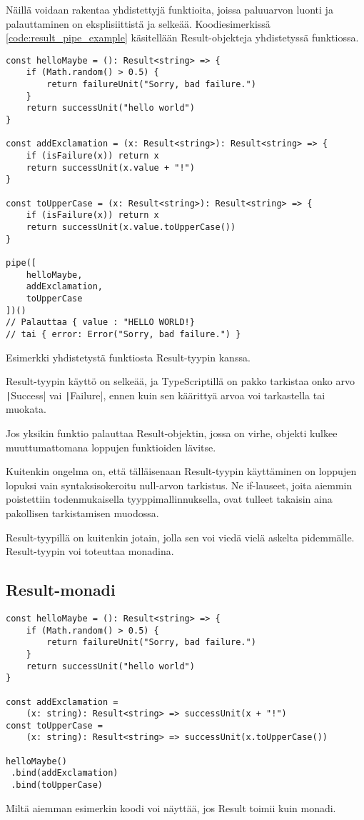 Näillä voidaan rakentaa yhdistettyjä funktioita, joissa paluuarvon luonti ja palauttaminen on eksplisiittistä ja selkeää. Koodiesimerkissä \ref{code:result_pipe_example} käsitellään Result-objekteja yhdistetyssä funktiossa.

\begin{code}
    \begin{verbatim}
const helloMaybe = (): Result<string> => {
    if (Math.random() > 0.5) {
        return failureUnit("Sorry, bad failure.")
    }
    return successUnit("hello world")
}

const addExclamation = (x: Result<string>): Result<string> => {
    if (isFailure(x)) return x
    return successUnit(x.value + "!")
}

const toUpperCase = (x: Result<string>): Result<string> => {
    if (isFailure(x)) return x
    return successUnit(x.value.toUpperCase())
}

pipe([
    helloMaybe,
    addExclamation,
    toUpperCase
])()
// Palauttaa { value : "HELLO WORLD!}
// tai { error: Error("Sorry, bad failure.") }
    \end{verbatim}
    \caption{Esimerkki yhdistetystä funktiosta Result-tyypin kanssa.}
    \label{code:result_pipe_example}
\end{code}

Result-tyypin käyttö on selkeää, ja TypeScriptillä on pakko tarkistaa onko arvo \texttt|Success| vai \texttt|Failure|, ennen kuin sen käärittyä arvoa voi tarkastella tai muokata.

Jos yksikin funktio palauttaa Result-objektin, jossa on virhe, objekti kulkee muuttumattomana loppujen funktioiden lävitse.

Kuitenkin ongelma on, että tälläisenaan Result-tyypin käyttäminen on loppujen lopuksi vain syntaksisokeroitu null-arvon tarkistus. Ne if-lauseet, joita aiemmin poistettiin todenmukaisella tyyppimallinnuksella, ovat tulleet takaisin aina pakollisen tarkistamisen muodossa.

Result-tyypillä on kuitenkin jotain, jolla sen voi viedä vielä askelta pidemmälle. Result-tyypin voi toteuttaa monadina.


\subsection{Result-monadi}

\begin{code}
    \begin{verbatim}
const helloMaybe = (): Result<string> => {
    if (Math.random() > 0.5) {
        return failureUnit("Sorry, bad failure.")
    }
    return successUnit("hello world")
}

const addExclamation = 
    (x: string): Result<string> => successUnit(x + "!")
const toUpperCase = 
    (x: string): Result<string> => successUnit(x.toUpperCase())

helloMaybe()
 .bind(addExclamation)
 .bind(toUpperCase)
\end{verbatim}
    \caption{Miltä aiemman esimerkin koodi voi näyttää, jos Result toimii kuin monadi.}
    \label{code:result_monad_example}
\end{code}


